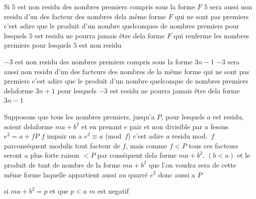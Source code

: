 \documentclass[11pt,a4paper]{article}
\begin{document}
Si $5$ est non residu des nombres premiers compris sous
la forme $F$ $5$ sera aussi non residu d'un des
facteur des nombres dela même forme $F$ qui ne sont
pas premiers c'est adire que le produit d'un nombre
quelconques de nombres premiers pour lesquels $5$
est residu ne pourra jamais être dela forme
$F$ qui renferme les nombres premiers pour lesquels
$5$ est non residu

$-3$ est non residu des nombres premiers compris
sous la forme $3n-1$ \quad $-3$ sera aussi non residu
d'un des facteurs des nombres de la même forme
qui ne sont pas premiers c'est adire que le produit
d'un nombre quelconque de nombres premiers delaforme
$3n+1$ pour lesquels $-3$ est residu ne pourra jamais être dela
forme $3n-1$


Supposons que tous les nombres premiers, jusqu'a
$P$, pour lesquels $a$ est residu, soient delaforme
$ma+b^{2}$ et en prenant $e$ pair et non divisible
par $a$ fesons $e^{2}=a+fP$ \quad $f$  impair
on a $e^{2}\equiv a$ (mod~$f$) c'est adire $a$ residu
mod.~$f$ parconséquent modulis tout facteur
de $f$, mais comme $f<P$ tous ces facteurs
seront a plus forte raison $<P$ par conséquent
dela forme $ma+b^{2}$. $(b<a)$
et le produit de tant de nombre de la
forme $ma+b^{2}$ que l'on voudra sera de
cette même forme laquelle appartient aussi
au quarré $e^{2}$ donc aussi a $P$

si $ma+b^{2}=p$ et que $p<a$
$m$ est negatif


\end{document}
